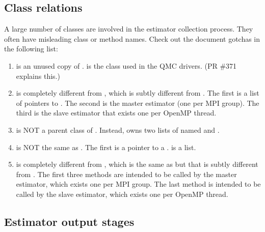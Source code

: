 \subsection{Class relations}
A large number of classes are involved in the estimator collection process. They often have misleading class or method names. Check out the document gotchas in the following list:
\begin{enumerate}
\item {} is an unused copy of .  is the class used in the QMC drivers. (PR \#371 explains this.)
\item {} is completely different from , which is subtly different from . The first is a list of pointers to . The second is the master estimator (one per MPI group). The third is the slave estimator that exists one per OpenMP thread.
\item {} is NOT a parent class of . Instead,  owns two lists of  named  and .
\item {} is NOT the same as . The first is a pointer to a .  is a list.
\item {} is completely different from 
, which is the same as  but that is subtly different from . The first three methods are intended to be called by the master estimator, which exists one per MPI group. The last method is intended to be called by the slave estimator, which exists one per OpenMP thread.
\end{enumerate}

\subsection{Estimator output stages}

